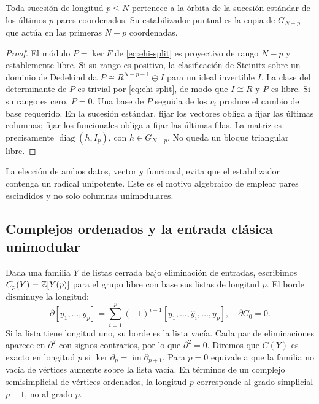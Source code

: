 \begin{lema}
\label{lem:ehi-stab}
Toda sucesión de longitud $p\le N$ pertenece a la órbita de la sucesión estándar de los últimos $p$ pares coordenados. Su estabilizador puntual es la copia de $G_{N-p}$ que actúa en las primeras $N-p$ coordenadas.
\end{lema}
\begin{proof}
El módulo $P=\ker F$ de \eqref{eq:ehi-split} es proyectivo de rango $N-p$ y establemente libre. Si su rango es positivo, la clasificación de Steinitz sobre un dominio de Dedekind da $P\cong R^{N-p-1}\oplus I$ para un ideal invertible $I$. La clase del determinante de $P$ es trivial por \eqref{eq:ehi-split}, de modo que $I\cong R$ y $P$ es libre. Si su rango es cero, $P=0$. Una base de $P$ seguida de los $v_i$ produce el cambio de base requerido. En la sucesión estándar, fijar los vectores obliga a fijar las últimas columnas; fijar los funcionales obliga a fijar las últimas filas. La matriz es precisamente $\operatorname{diag}(h,I_p)$, con $h\in G_{N-p}$. No queda un bloque triangular libre.
\end{proof}

La elección de ambos datos, vector y funcional, evita que el estabilizador contenga un radical unipotente. Este es el motivo algebraico de emplear pares escindidos y no solo columnas unimodulares.

\subsection{Complejos ordenados y la entrada clásica unimodular}

Dada una familia $Y$ de listas cerrada bajo eliminación de entradas, escribimos $C_p(Y)=\mathbb{Z}[Y(p)]$ para el grupo libre con base sus listas de longitud $p$. El borde disminuye la longitud:
\begin{equation}
 \partial[y_1,\ldots,y_p]=\sum_{i=1}^{p}(-1)^{i-1}
 [y_1,\ldots,\widehat y_i,\ldots,y_p],\quad \partial C_0=0.
 \label{eq:ehi-boundary}
\end{equation}
Si la lista tiene longitud uno, su borde es la lista vacía. Cada par de eliminaciones aparece en $\partial^2$ con signos contrarios, por lo que $\partial^2=0$. Diremos que $C(Y)$ es exacto en longitud $p$ si $\ker\partial_p=\operatorname{im}\partial_{p+1}$. Para $p=0$ equivale a que la familia no vacía de vértices aumente sobre la lista vacía. En términos de un complejo semisimplicial de vértices ordenados, la longitud $p$ corresponde al grado simplicial $p-1$, no al grado $p$.

